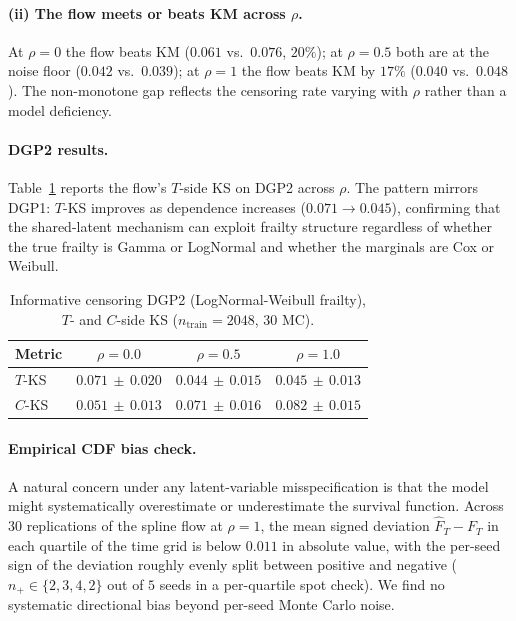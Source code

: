 \paragraph{(ii) The flow meets or beats KM across $\rho$.}
At $\rho = 0$ the flow beats KM ($0.061$ vs.\ $0.076$, $20\%$); at
$\rho = 0.5$ both are at the noise floor ($0.042$ vs.\ $0.039$); at
$\rho = 1$ the flow beats KM by $17\%$ ($0.040$ vs.\ $0.048$).
%
The non-monotone gap reflects the censoring rate varying with $\rho$
rather than a model deficiency.

\paragraph{DGP2 results.}
Table~\ref{tab:dgp2} reports the flow's $T$-side KS on DGP2 across
$\rho$. The pattern mirrors DGP1: $T$-KS improves as dependence
increases ($0.071 \to 0.045$), confirming that the shared-latent
mechanism can exploit frailty structure regardless of whether the true
frailty is Gamma or LogNormal and whether the marginals are Cox or
Weibull.

\begin{table}[t]
\caption{Informative censoring DGP2 (LogNormal-Weibull frailty), $T$-
and $C$-side KS ($n_{\text{train}} = 2048$, $30$ MC).}
\label{tab:dgp2}
\centering
\small
\begin{tabular}{lccc}
\toprule
Metric & $\rho = 0.0$ & $\rho = 0.5$ & $\rho = 1.0$ \\
\midrule
$T$-KS & $0.071\,{\pm}\,0.020$ & $\mathbf{0.044\,{\pm}\,0.015}$ & $0.045\,{\pm}\,0.013$ \\
$C$-KS & $\mathbf{0.051\,{\pm}\,0.013}$ & $0.071\,{\pm}\,0.016$ & $0.082\,{\pm}\,0.015$ \\
\bottomrule
\end{tabular}
\end{table}

\paragraph{Empirical CDF bias check.}
A natural concern under any latent-variable misspecification is that the
model might systematically overestimate or underestimate the survival
function. Across $30$ replications of the spline flow at $\rho = 1$, the
mean signed deviation $\widehat{F}_T - F_T$ in each quartile of the time
grid is below $0.011$ in absolute value, with the per-seed sign of the
deviation roughly evenly split between positive and negative ($n_+ \in
\{2, 3, 4, 2\}$ out of $5$ seeds in a per-quartile spot check). We find
no systematic directional bias beyond per-seed Monte Carlo noise.

